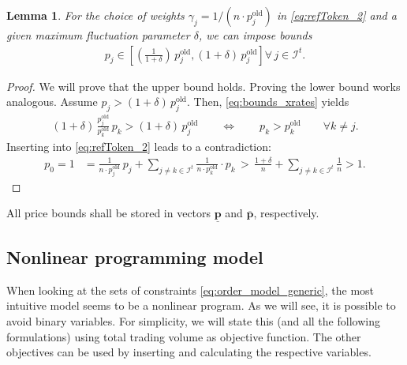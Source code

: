\documentclass[11pt,parskip=full]{scrartcl}%
\newcommand*{\itokens}{\mathcal{I}^t}       %
\newtheorem{lemma}[theorem]{Lemma}
\begin{document}
\begin{lemma}
  For the choice of weights $ \gamma_j = 1 / (n \cdot p_j^\mathrm{old}) $ in \eqref{eq:refToken_2}
  and a given maximum fluctuation parameter $ \delta $, we can impose bounds
  \begin{align}
    p_j \in \left[ \left(\frac{1}{1+\delta}\right) \, p^\mathrm{old}_j, (1+\delta) \,
  p^
  \mathrm{old}_j \right] \forall \, j \in \itokens.
  \end{align}
\end{lemma}
\vspace{-.5cm}
\begin{proof}
  We will prove that the upper bound holds.
  Proving the lower bound works analogous.
  Assume $ p_j > (1+\delta) \, p_j^\mathrm{old} $.
  Then, \eqref{eq:bounds_xrates} yields
  \begin{align*}
    (1+\delta) \, \frac{p^\mathrm{old}_j}{p^\mathrm{old}_k} \, p_k > (1+\delta) \, p_j^\mathrm{old}
    \qquad \Leftrightarrow \qquad p_k > p_k^\mathrm{old}
    \qquad \forall k \neq j.
  \end{align*}
  Inserting into \eqref{eq:refToken_2} leads to a contradiction:
  \begin{align*}
    p_0 = 1
    &= \frac{1}{n \cdot p_j^\mathrm{old}} \, p_j + \sum\limits_{j \neq k \in \itokens}
      \frac{1}{n \cdot p_k^\mathrm{old}} \cdot p_k
    \, > \, \frac{1+\delta}{n} + \sum\limits_{j \neq k \in \itokens} \frac{1}{n} > 1.
  \end{align*}
\end{proof}
\vspace{-.4cm}

All price bounds shall be stored in vectors $\underline{\mathbf{p}}$ and $\overline{\mathbf{p}}$,
respectively.

\newpage
\subsection{Nonlinear programming model}
\label{subsec:NLPmodel}

When looking at the sets of constraints \eqref{eq:order_model_generic}, the most intuitive model seems to be a nonlinear program.
As we will see, it is possible to avoid binary variables.
For simplicity, we will state this (and all the following formulations) using total trading volume as objective function.
The other objectives can be used by inserting and calculating the respective variables.
\end{document}
